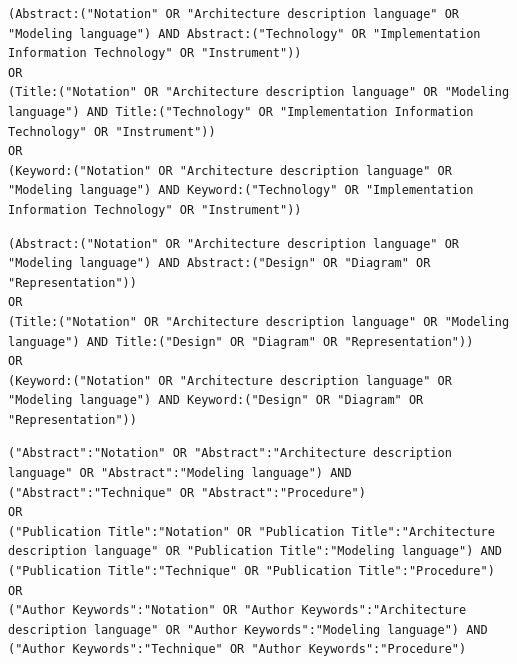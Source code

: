 \begin{tcolorbox}[
	colback=gray!5,
	colframe=black!60,
	title=Cadena de búsqueda en ACM Full Text Collection para ``Tecnología'',
	fonttitle=\bfseries,
	sharp corners=south
]
\scriptsize
\begin{lstlisting}[breaklines=true]
(Abstract:("Notation" OR "Architecture description language" OR "Modeling language") AND Abstract:("Technology" OR "Implementation Information Technology" OR "Instrument")) 
OR 
(Title:("Notation" OR "Architecture description language" OR "Modeling language") AND Title:("Technology" OR "Implementation Information Technology" OR "Instrument"))
OR 
(Keyword:("Notation" OR "Architecture description language" OR "Modeling language") AND Keyword:("Technology" OR "Implementation Information Technology" OR "Instrument")) 
\end{lstlisting}
\end{tcolorbox}

\begin{tcolorbox}[
	colback=gray!5,
	colframe=black!60,
	title=Cadena de búsqueda en ACM Full Text Collection para ``Diseño'',
	fonttitle=\bfseries,
	sharp corners=south
]
\scriptsize
\begin{lstlisting}[breaklines=true]
(Abstract:("Notation" OR "Architecture description language" OR "Modeling language") AND Abstract:("Design" OR "Diagram" OR "Representation")) 
OR 
(Title:("Notation" OR "Architecture description language" OR "Modeling language") AND Title:("Design" OR "Diagram" OR "Representation")) 
OR 
(Keyword:("Notation" OR "Architecture description language" OR "Modeling language") AND Keyword:("Design" OR "Diagram" OR "Representation")) 
\end{lstlisting}
\end{tcolorbox}

\begin{tcolorbox}[
	colback=gray!5,
	colframe=black!60,
	title=Cadena de búsqueda en IEEE Xplore para ``Metodología'',
	fonttitle=\bfseries,
	sharp corners=south
]
\scriptsize
\begin{lstlisting}[breaklines=true]
("Abstract":"Notation" OR "Abstract":"Architecture description language" OR "Abstract":"Modeling language") AND ("Abstract":"Technique" OR "Abstract":"Procedure") 
OR 
("Publication Title":"Notation" OR "Publication Title":"Architecture description language" OR "Publication Title":"Modeling language") AND ("Publication Title":"Technique" OR "Publication Title":"Procedure") 
OR 
("Author Keywords":"Notation" OR "Author Keywords":"Architecture description language" OR "Author Keywords":"Modeling language") AND ("Author Keywords":"Technique" OR "Author Keywords":"Procedure")
\end{lstlisting}
\end{tcolorbox}

